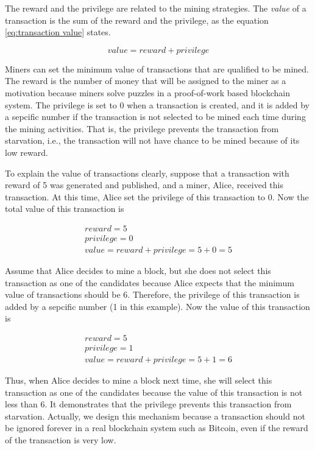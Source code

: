The reward and the privilege are related to the mining strategies. The \textit{value} of a transaction is the sum of the reward and the privilege, as the equation \ref{eq:transaction value} states.

\begin{equation} \label{eq:transaction value}
    value = reward + privilege
\end{equation}

Miners can set the minimum value of transactions that are qualified to be mined. The reward is the number of money that will be assigned to the miner as a motivation because miners solve puzzles in a proof-of-work based blockchain system. The privilege is set to 0 when a transaction is created, and it is added by a sepcific number if the transaction is not selected to be mined each time during the mining activities. That is, the privilege prevents the transaction from starvation, i.e., the transaction will not have chance to be mined because of its low reward.

To explain the value of transactions clearly, suppose that a transaction with reward of 5 was generated and published, and a miner, Alice, received this transaction. At this time, Alice set the privilege of this transaction to 0. Now the total value of this transaction is 

\begin{gather*}
    reward = 5 \\
    privilege = 0 \\
    value = reward + privilege = 5 + 0 = 5
\end{gather*}

Assume that Alice decides to mine a block, but she does not select this transaction as one of the candidates because Alice expects that the minimum value of transactions should be 6. Therefore, the privilege of this transaction is added by a sepcific number (1 in this example). Now the value of this transaction is

\begin{gather*}
    reward = 5 \\
    privilege = 1 \\
    value = reward + privilege = 5 + 1 = 6
\end{gather*}

Thus, when Alice decides to mine a block next time, she will select this transaction as one of the candidates because the value of this transaction is not less than 6. It demonstrates that the privilege prevents this transaction from starvation. Actually, we design this mechanism because a transaction should not be ignored forever in a real blockchain system such as Bitcoin, even if the reward of the transaction is very low.

